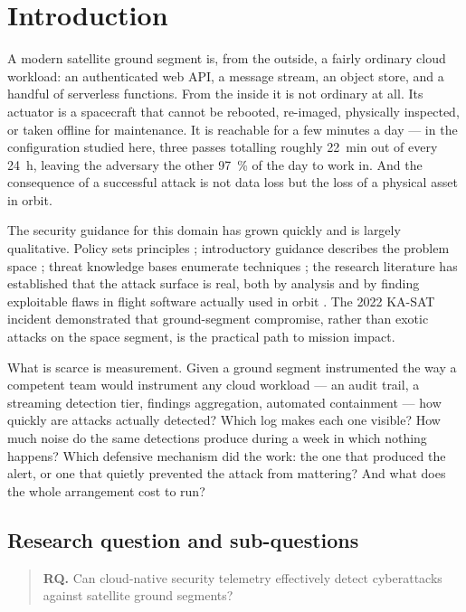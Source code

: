 \section{Introduction}

A modern satellite ground segment is, from the outside, a fairly ordinary cloud
workload: an authenticated web API, a message stream, an object store, and a
handful of serverless functions. From the inside it is not ordinary at all. Its
actuator is a spacecraft that cannot be rebooted, re-imaged, physically
inspected, or taken offline for maintenance. It is reachable for a few minutes a
day --- in the configuration studied here, three passes totalling roughly
\SI{22}{\minute} out of every \SI{24}{\hour}, leaving the adversary the other
\SI{97}{\percent} of the day to work in. And the consequence of a successful
attack is not data loss but the loss of a physical asset in orbit.

The security guidance for this domain has grown quickly and is largely
qualitative. Policy sets principles \cite{spd5}; introductory guidance describes
the problem space \cite{nistir8270}; threat knowledge bases enumerate techniques
\cite{sparta}; the research literature has established that the attack surface is
real, both by analysis \cite{falco2019principles,manulis2021newspace,pavur2020launchpad}
and by finding exploitable flaws in flight software actually used in orbit
\cite{willbold2023odyssey}. The 2022 KA-SAT incident \cite{viasat2022}
demonstrated that ground-segment compromise, rather than exotic attacks on the
space segment, is the practical path to mission impact.

What is scarce is measurement. Given a ground segment instrumented the way a
competent team would instrument any cloud workload --- an audit trail, a
streaming detection tier, findings aggregation, automated containment --- how
quickly are attacks actually detected? Which log makes each one visible? How much
noise do the same detections produce during a week in which nothing happens? Which
defensive mechanism did the work: the one that produced the alert, or one that
quietly prevented the attack from mattering? And what does the whole arrangement
cost to run?

\subsection*{Research question and sub-questions}

\begin{quote}
\textbf{RQ.} Can cloud-native security telemetry effectively detect cyberattacks
against satellite ground segments?
\end{quote}

